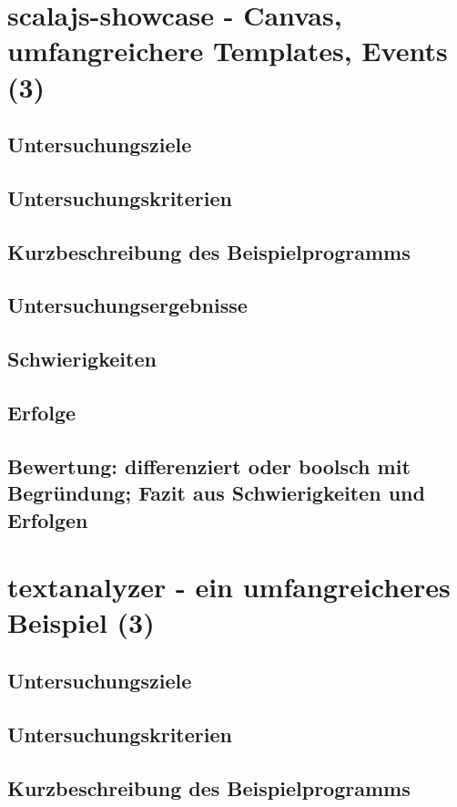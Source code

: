 \documentclass[a4paper, 12pt, listof=totoc, bibliography=totoc]{scrreprt}
\begin{document}
\section{scalajs-showcase - Canvas, umfangreichere Templates, Events (3)}

\subsection{Untersuchungsziele}
\subsection{Untersuchungskriterien}
\subsection{Kurzbeschreibung des Beispielprogramms}
\subsection{Untersuchungsergebnisse}
\subsection{Schwierigkeiten}
\subsection{Erfolge}
\subsection{Bewertung: differenziert oder boolsch mit Begründung; Fazit aus Schwierigkeiten und Erfolgen}

\section{textanalyzer - ein umfangreicheres Beispiel (3)}

\subsection{Untersuchungsziele}
\subsection{Untersuchungskriterien}
\subsection{Kurzbeschreibung des Beispielprogramms}
\end{document}
